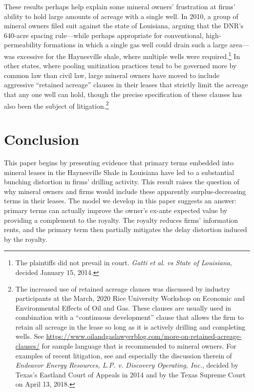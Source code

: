 \documentclass[12pt]{article}
\begin{document}
These results perhaps help explain some mineral owners' frustration at firms' ability to hold large amounts of acreage with a single well. In 2010, a group of mineral owners filed suit against the state of Louisiana, arguing that the DNR's 640-acre spacing rule---while perhaps appropriate for conventional, high-permeability formations in which a single gas well could drain such a large area---was excessive for the Haynesville shale, where multiple wells were required.\footnote{The plaintiffs did not prevail in court. \emph{Gatti et al. vs State of Louisiana}, decided January 15, 2014.} In other states, where pooling unitization practices tend to be governed more by common law than civil law, large mineral owners have moved to include aggressive ``retained acreage'' clauses in their leases that strictly limit the acreage that any one well can hold, though the precise specification of these clauses has also been the subject of litigation.\footnote{The increased use of retained acreage clauses was discussed by industry participants at the March, 2020 Rice University Workshop on Economic and Environmental Effects of Oil and Gas. These clauses are usually used in combination with a ``continuous development'' clause that allows the firm to retain all acreage in the lease so long as it is actively drilling and completing wells. See \url{https://www.oilandgaslawyerblog.com/more-on-retained-acreage-clauses/} for sample language that is recommended to mineral owners. For examples of recent litigation, see \citet{bib:durrett} and especially the discussion therein of \emph{Endeavor Energy Resources, L.P. v. Discovery Operating, Inc.}, decided by Texas's Eastland Court of Appeals in 2014 and by the Texas Supreme Court on April 13, 2018.}



\section{Conclusion \label{sec:Conclusion}}

This paper begins by presenting evidence that primary terms embedded into mineral leases in the Haynesville Shale in Louisiana have led to a substantial bunching distortion in firms' drilling activity. This result raises the question of why mineral owners and firms would include these apparently surplus-decreasing terms in their leases. The model we develop in this paper suggests an answer: primary terms can actually improve the owner's ex-ante expected value by providing a complement to the royalty. The royalty reduces firms' information rents, and the primary term then partially mitigates the delay distortion induced by the royalty.
\end{document}
